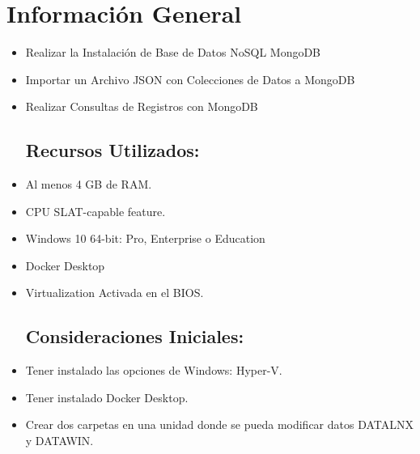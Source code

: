 \section{Información General}

	\begin{itemize}
		\subsection{Objetivos:}
			\item Realizar la Instalación de Base de Datos NoSQL MongoDB
			\item Importar un Archivo JSON con Colecciones de Datos a MongoDB
			\item Realizar Consultas de Registros con MongoDB
		\subsection{Recursos Utilizados:}
			\item Al menos 4 GB de RAM.
			\item CPU SLAT-capable feature.
			\item Windows 10 64-bit: Pro, Enterprise o Education
			\item Docker Desktop
			\item Virtualization Activada en el BIOS.
		\subsection{Consideraciones Iniciales:}
			\item Tener instalado las opciones de Windows: Hyper-V.
			\item Tener instalado Docker Desktop.
			\item Crear dos carpetas en una unidad donde se pueda modificar datos DATALNX y DATAWIN.
	\end{itemize}